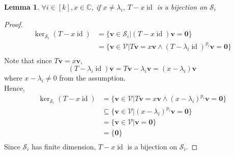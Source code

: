 \documentclass{article}
\theoremstyle{plain}
\newtheorem{lemma}[theorem]{Lemma}
\theoremstyle{definition}
\newcommand{\0}{\mathbf{0}}
\renewcommand{\vec}{\mathbf}
\newcommand{\C}{\mathbb{C}}
\newcommand{\N}{\mathbb{N}}
\newcommand{\vecspace}[1]{\mathcal{#1}}
\DeclareMathOperator{\id}{id}
\begin{document}
\begin{lemma}
    \label{lemma:bijection}
    $\forall i\in[k], x\in\C$, if $x\neq\lambda_i$, $T-x\id$ is a bijection on $\vecspace{S}_i$
\end{lemma}
\begin{proof}
    \begin{align*}
        \ker_{\vecspace{S}_i}(T-x\id)
        &=\{\vec{v}\in\vecspace{S}_i|(T-x\id)\vec{v}=\0\}\\
        &=\{\vec{v}\in\vecspace{V}|T\vec{v}=x\vec{v} \land (T-\lambda_i\id)^{p_i}\vec{v}=\0\}\\
    \end{align*}
    Note that since $T\vec{v}=x\vec{v}$,
    \begin{equation*}
        (T-\lambda_i\id)\vec{v}=T\vec{v}-\lambda_i\vec{v}=(x-\lambda_i)\vec{v}
    \end{equation*}
    where $x-\lambda_i\neq0$ from the assumption. \\
    Hence,
    \begin{align*}
        \ker_{\vecspace{S}_i}(T-x\id)
        &=\{\vec{v}\in\vecspace{V}|T\vec{v}=x\vec{v} \land (x-\lambda_i)^{p_i}\vec{v}=\0\}\\
        &\subseteq\{\vec{v}\in\vecspace{V}|(x-\lambda_i)^{p_i}\vec{v}=\0\}\\
        &=\{\vec{v}\in\vecspace{V}|\vec{v}=\0\}\\
        &=\{\0\}\\
    \end{align*}
    Since $\vecspace{S}_i$ has finite dimension, $T-x\id$ is a bijection on $\vecspace{S}_i$.
\end{proof}

\end{document}
